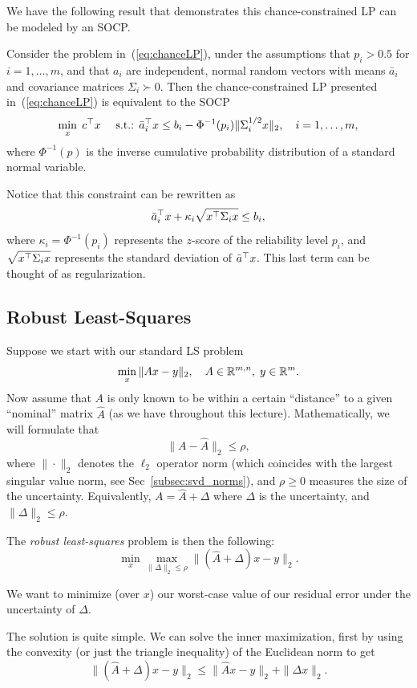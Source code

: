 \documentclass[11 pt]{scrartcl}
\begin{document}
We have the following result that demonstrates this chance-constrained LP can be modeled by an SOCP. 

\begin{theorem}
    Consider the problem in~(\ref{eq:chanceLP}), under the assumptions that $p_i > 0.5$ for $i = 1,\dots, m$, and that $a_i$ are independent, normal random vectors with means $\bar{a}_i$ and covariance matrices $\Sigma_i \succ 0$. 
    Then the chance-constrained LP presented in~(\ref{eq:chanceLP}) is equivalent to the SOCP 
    \begin{align*}
        \min_x\; c^\top x\quad \text{ s.t.: } \bar{a}_i^\top x \leq b_i - \Phi^{-1}(p_i) \|\Sigma_i^{1/2} x\|_2,\quad i = 1,\dots, m,
    \end{align*}
    where $\Phi^{-1}(p)$ is the inverse cumulative probability distribution of a standard normal variable.
\end{theorem}

Notice that this constraint can be rewritten as 
\[ \bar{a}_i^\top x + \kappa_i \sqrt{x^\top \Sigma_i x} \leq b_i,\] 
where $\kappa_i = \Phi^{-1}(p_i)$ represents the $z$-score of the reliability level $p_i$, and $\sqrt{x^\top \Sigma_i x}$ represents the standard deviation of $\bar{a}^\top x$. 
This last term can be thought of as regularization.

\subsection{Robust Least-Squares}
Suppose we start with our standard LS problem 
\[ \min_x \|Ax - y\|_2, \quad A\in \mathbb R^{m,n},\; y\in\mathbb R^m.\]
Now assume that $A$ is only known to be within a certain ``distance'' to a given ``nominal'' matrix $\hat{A}$ (as we have throughout this lecture). 
Mathematically, we will formulate that 
\[ \|A - \hat{A} \|_2 \leq \rho,\] 
where $\|\cdot\|_2$ denotes the $\ell_2$ operator norm (which coincides with the largest singular value norm, see Sec~\ref{subsec:svd_norms}), 
and $\rho\geq 0$ measures the size of the uncertainty.
Equivalently, $A = \hat{A} + \Delta$ where $\Delta$ is the uncertainty, and $\|\Delta\|_2 \leq \rho$. 

The \emph{robust least-squares} problem is then the following: 
\[ \min_x \max_{\|\Delta \|_2 \leq \rho} \| (\hat{A} + \Delta)x - y \|_2.\] 

We want to minimize (over $x$) our worst-case value of our residual error under the uncertainty of $\Delta$. 

The solution is quite simple. 
We can solve the inner maximization, first by using the convexity (or just the triangle inequality) of the Euclidean norm to get 
\[ \|(\hat{A} + \Delta)x - y \|_2 \leq \|\hat{A}x - y\|_2 + \|\Delta x\|_2.\] 
\end{document}
